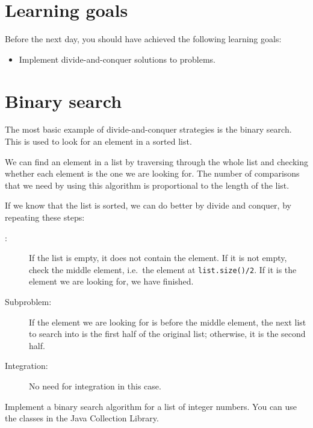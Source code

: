 \documentclass{article}
\begin{document}
\section*{Learning goals}
\label{sec:learning-goals}

Before the next day, you should have achieved the following learning
goals: 

\begin{itemize}
\item Implement divide-and-conquer solutions to problems. 
\end{itemize}

\section{Binary search}
\label{sec:binary-search}

The most basic example of divide-and-conquer strategies is the binary
search. This is used to look for an element in a sorted list. 

We can find an element in a list by traversing through the whole list
and checking whether each element is the one we are looking for. The
number of comparisons that we need by using this algorithm is
proportional to the length of the list. 

If we know that the list is sorted, we can do better by divide and
conquer, by repeating these steps: 

\begin{description}
\item[: ] If the list is empty, it does not contain the
  element. If it is not empty, check the middle element, i.e.~the
  element at \verb+list.size()/2+. If it is the element we are looking
  for, we have finished. 
\item[Subproblem: ] If the element we are looking for is before the
  middle element, the next list to search into is the first half of
  the original list; otherwise, it is the second half.
\item[Integration: ] No need for integration in this case.  
\end{description}

Implement a binary search algorithm for a list of integer numbers. You
can use the classes in the Java Collection Library. 

%
%
\end{document}
